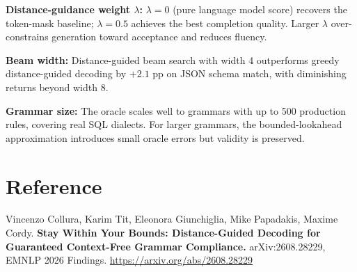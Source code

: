 \documentclass[10pt,twocolumn]{article}
\begin{document}
\textbf{Distance-guidance weight $\lambda$:} $\lambda = 0$ (pure
language model score) recovers the token-mask baseline; $\lambda = 0.5$
achieves the best completion quality. Larger $\lambda$ over-constrains
generation toward acceptance and reduces fluency.

\textbf{Beam width:} Distance-guided beam search with width 4
outperforms greedy distance-guided decoding by $+2.1$ pp on JSON
schema match, with diminishing returns beyond width 8.

\textbf{Grammar size:} The oracle scales well to grammars with up to
500 production rules, covering real SQL dialects. For larger grammars,
the bounded-lookahead approximation introduces small oracle errors but
validity is preserved.

\section*{Reference}

Vincenzo Collura, Karim Tit, Eleonora Giunchiglia, Mike Papadakis,
Maxime Cordy.
\textbf{Stay Within Your Bounds: Distance-Guided Decoding for
Guaranteed Context-Free Grammar Compliance.}
arXiv:2608.28229, EMNLP 2026 Findings.
\url{https://arxiv.org/abs/2608.28229}
\end{document}
